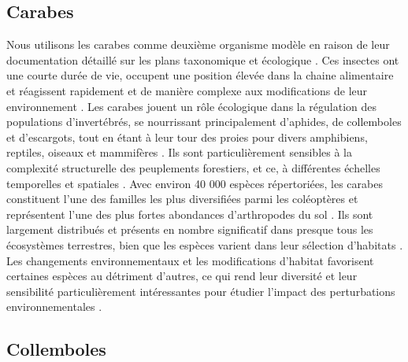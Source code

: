 \subsection*{Carabes}

Nous utilisons les carabes comme deuxième organisme modèle en raison de leur documentation détaillé sur les plans taxonomique et écologique \citep{loveiEcologyBehaviorGround1996}. 
Ces insectes ont une courte durée de vie, occupent une position élevée dans la chaine alimentaire et réagissent rapidement et de manière complexe aux modifications de leur environnement \citep{loveiEcologyBehaviorGround1996}.
Les carabes jouent un rôle écologique dans la régulation des populations d'invertébrés, se nourrissant principalement d'aphides, de collemboles et d'escargots, tout en étant à leur tour des proies pour divers amphibiens, reptiles, oiseaux et mammifères \citep{loveiEcologyBehaviorGround1996}. 
Ils sont particulièrement sensibles à la complexité structurelle des peuplements forestiers, et ce, à différentes échelles temporelles et spatiales \citep{Butterfield1995Carabidbeetle,loveiEcologyBehaviorGround1996,Niemela2007effectsforestry}.
Avec environ 40 000 espèces répertoriées, les carabes constituent l'une des familles les plus diversifiées parmi les coléoptères et représentent l'une des plus fortes abondances d'arthropodes du sol \citep{Erwin1985taxonpulse,loveiEcologyBehaviorGround1996,Rochefort2006GroundBeetle}. 
Ils sont largement distribués et présents en nombre significatif dans presque tous les écosystèmes terrestres, bien que les espèces varient dans leur sélection d'habitats \citep{loveiEcologyBehaviorGround1996,kotzeFortyYearsCarabid2011a,Larochelle2003naturalhistory}. 
Les changements environnementaux et les modifications d'habitat favorisent certaines espèces au détriment d'autres, ce qui rend leur diversité et leur sensibilité particulièrement intéressantes pour étudier l'impact des perturbations environnementales \citep{Rainio2003Groundbeetles}.

\subsection*{Collemboles}

